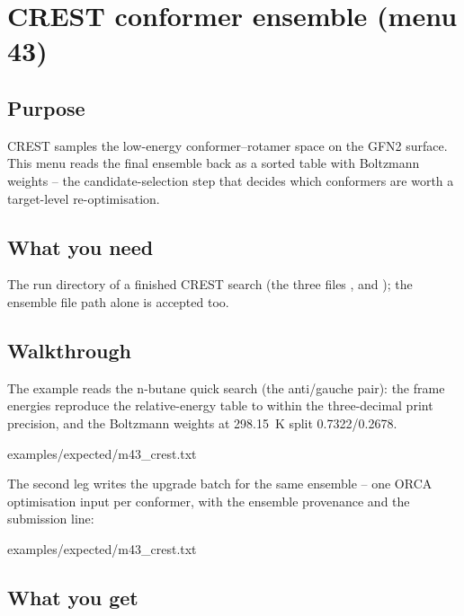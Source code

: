\chapter{CREST conformer ensemble (menu 43)}
\label{ch:menu43}

\section{Purpose}

CREST samples the low-energy conformer--rotamer space on the GFN2 surface.
This menu reads the final ensemble back as a sorted table with Boltzmann
weights -- the candidate-selection step that decides which conformers are
worth a target-level re-optimisation.

\section{What you need}

The run directory of a finished CREST search (the three files
,  and
); the ensemble file path alone is accepted too.

\section{Walkthrough}

The example reads the n-butane quick search (the anti/gauche pair): the
frame energies reproduce the relative-energy table to within the
three-decimal print precision, and the Boltzmann weights at 298.15~K
split 0.7322/0.2678.


  {examples/expected/m43_crest.txt}

The second leg writes the upgrade batch for the same ensemble -- one ORCA
optimisation input per conformer, with the ensemble provenance and the
submission line:


  {examples/expected/m43_crest.txt}

\section{What you get}

